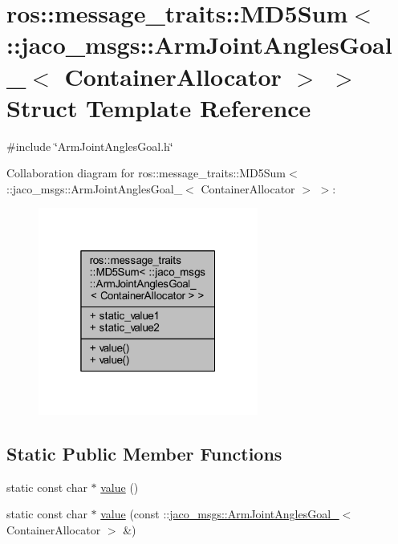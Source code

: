 \hypertarget{structros_1_1message__traits_1_1MD5Sum_3_01_1_1jaco__msgs_1_1ArmJointAnglesGoal___3_01ContainerAllocator_01_4_01_4}{}\section{ros\+:\+:message\+\_\+traits\+:\+:M\+D5\+Sum$<$ \+:\+:jaco\+\_\+msgs\+:\+:Arm\+Joint\+Angles\+Goal\+\_\+$<$ Container\+Allocator $>$ $>$ Struct Template Reference}
\label{structros_1_1message__traits_1_1MD5Sum_3_01_1_1jaco__msgs_1_1ArmJointAnglesGoal___3_01ContainerAllocator_01_4_01_4}


{\ttfamily \#include \char`\"{}Arm\+Joint\+Angles\+Goal.\+h\char`\"{}}



Collaboration diagram for ros\+:\+:message\+\_\+traits\+:\+:M\+D5\+Sum$<$ \+:\+:jaco\+\_\+msgs\+:\+:Arm\+Joint\+Angles\+Goal\+\_\+$<$ Container\+Allocator $>$ $>$\+:
\nopagebreak
\begin{figure}[H]
\begin{center}
\leavevmode
\includegraphics[width=205pt]{d4/d05/structros_1_1message__traits_1_1MD5Sum_3_01_1_1jaco__msgs_1_1ArmJointAnglesGoal___3_01ContainerAllocator_01_4_01_4__coll__graph}
\end{center}
\end{figure}
\subsection*{Static Public Member Functions}
\begin{DoxyCompactItemize}
\item 
static const char $\ast$ \hyperlink{structros_1_1message__traits_1_1MD5Sum_3_01_1_1jaco__msgs_1_1ArmJointAnglesGoal___3_01ContainerAllocator_01_4_01_4_acf512e5cd2c3ac8f3e6a4cf97fe27a70}{value} ()
\item 
static const char $\ast$ \hyperlink{structros_1_1message__traits_1_1MD5Sum_3_01_1_1jaco__msgs_1_1ArmJointAnglesGoal___3_01ContainerAllocator_01_4_01_4_adb79ed9139526b78b2d19c18837596ed}{value} (const \+::\hyperlink{structjaco__msgs_1_1ArmJointAnglesGoal__}{jaco\+\_\+msgs\+::\+Arm\+Joint\+Angles\+Goal\+\_\+}$<$ Container\+Allocator $>$ \&)
\end{DoxyCompactItemize}

